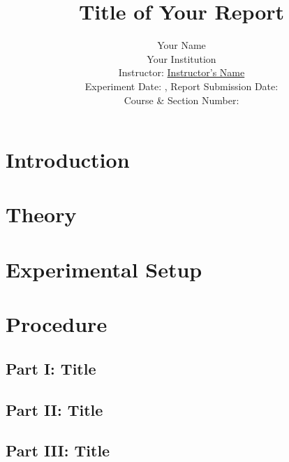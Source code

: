 \documentclass[journal]{IEEEtran}
\begin{document}
\title{Title of Your Report}
\author{Your Name\\
Your Institution\\
Instructor: \underline{Instructor's Name} \\ %
Experiment Date: , Report Submission Date: \\
Course \& Section Number: }

\maketitle

\begin{abstract}
\end{abstract}

\section{Introduction}

\section{Theory}

\section{Experimental Setup}

\section{Procedure}
\subsection{Part I: Title}

\subsection{Part II: Title}

\subsection{Part III: Title}
\end{document}
